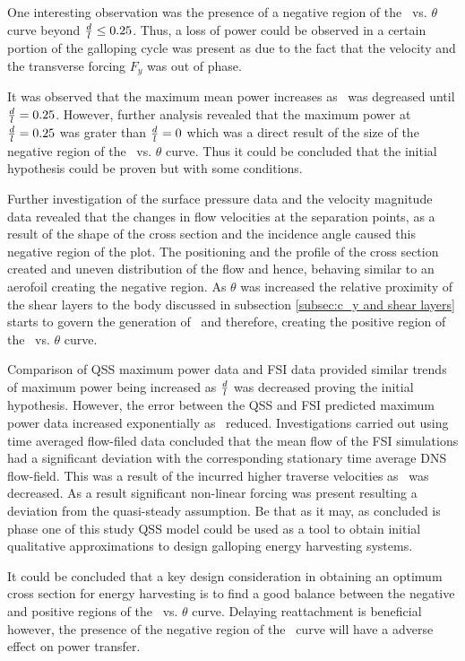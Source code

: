  One interesting observation was the presence of a negative region of the \cy\ vs. $\theta$ curve beyond $\frac{d}{l}\leq0.25$. Thus, a loss of power could be observed in a certain portion of the galloping cycle was present as due to the fact that the velocity and the transverse forcing $F_{y}$ was out of phase. 
 
 It was observed that the maximum mean power increases as \ratio\ was degreased until $\frac{d}{l}=0.25$. However, further analysis revealed that the maximum power at $\frac{d}{l}=0.25$ was grater than $\frac{d}{l}=0$ which was a direct result of the size of the negative region of the \cy\ vs. $\theta$ curve. Thus it could be concluded that the initial hypothesis could be proven but with some conditions.  
 
 Further investigation of the surface pressure data and the velocity magnitude data revealed that the changes in flow velocities at the separation points, as a result of the shape of the cross section and the incidence angle caused this negative region of the \cy plot. The positioning and the profile of the cross section created and uneven distribution of the flow and hence, behaving similar to an aerofoil creating the negative region. As $\theta$ was increased the relative proximity of the shear layers to the body  discussed in subsection \ref{subsec:c_y and shear layers} starts to govern the generation of \cy\ and therefore, creating the positive region of the \cy\ vs. $\theta$ curve.    
 
 Comparison of QSS maximum power data and FSI data provided similar trends of maximum power being increased as $\frac{d}{l}$ was decreased proving the initial hypothesis. However, the error between the QSS and FSI predicted maximum power data increased exponentially as \ratio\ reduced. Investigations carried out using time averaged flow-filed data concluded that the mean flow of the FSI simulations had a significant deviation with the corresponding stationary time average DNS flow-field. This was a result of the incurred higher  traverse velocities as \ratio\ was decreased. As a result significant non-linear forcing was present resulting a deviation from the quasi-steady assumption. Be that as it may, as concluded is phase one of this study QSS model could be used as a tool to obtain initial qualitative approximations to design galloping energy harvesting systems. 
 
 It could be concluded that a key design consideration in obtaining an optimum cross section for energy harvesting is to find a good balance between the negative and positive regions of the \cy\ vs. $\theta$ curve. Delaying reattachment is beneficial however, the presence of the negative region of the \cy\ curve will have a adverse effect on power transfer. 
 
